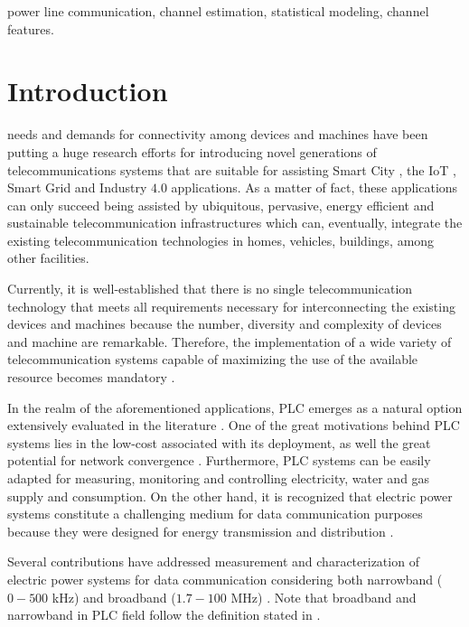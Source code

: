 \documentclass[journal]{IEEEtran}
\begin{document}
\begin{IEEEkeywords}
power line communication, channel estimation, statistical modeling, channel features.
\end{IEEEkeywords}
\acresetall

\section{Introduction}\label{sec:intro}
 needs and demands for connectivity among devices and machines have been putting a huge research efforts for introducing novel generations of telecommunications systems that are suitable for assisting  
Smart City \cite{Andrisano2018}, the \ac{IoT} \cite{Minoli2017}, Smart Grid \cite{Masera2018} and Industry $4.0$ \cite{Wollschlaeger2017} applications. As a matter of fact, these applications can only succeed being assisted by ubiquitous, pervasive, energy efficient and sustainable telecommunication infrastructures  which can, eventually, integrate the existing telecommunication technologies in homes, vehicles, buildings, among other  facilities. 

Currently, it is well-established that there is no single telecommunication technology that meets all requirements necessary for interconnecting the existing devices and machines because the number, diversity and complexity of devices and machine are remarkable. Therefore, the implementation of a wide variety of telecommunication systems capable of maximizing the use of the available resource becomes mandatory \cite{Mehmood2017, M.B.A.Dib2018}.

In the realm of the aforementioned applications, \ac{PLC} emerges as a natural option extensively  evaluated in the literature \cite{Yan2013, Han2017, Artale2018}. 
One of the great motivations behind  \ac{PLC} systems lies in the low-cost associated with its deployment, as well the great potential for network convergence  \cite{Willie2006,M.B.A.Dib2018,Oliveira2017}. 
Furthermore, \ac{PLC} systems can be easily adapted for  measuring, monitoring and controlling electricity, water and gas supply and consumption.
On the other hand, it is recognized that electric power systems constitute a challenging medium for data communication purposes because they were designed for energy transmission and distribution \cite{Corripio2006,Musolino2008,Zimmermann2000}. 

Several contributions have addressed measurement and characterization of electric power systems for data communication considering both narrowband ($0-500$ kHz) \cite{Liu2011,Gassara2014} and broadband ($1.7-100$ MHz) \cite{Anatory2009, Tonello2014}. Note that broadband and narrowband in \ac{PLC} field follow the definition stated in \cite{Oliveira2018}. 
\end{document}
